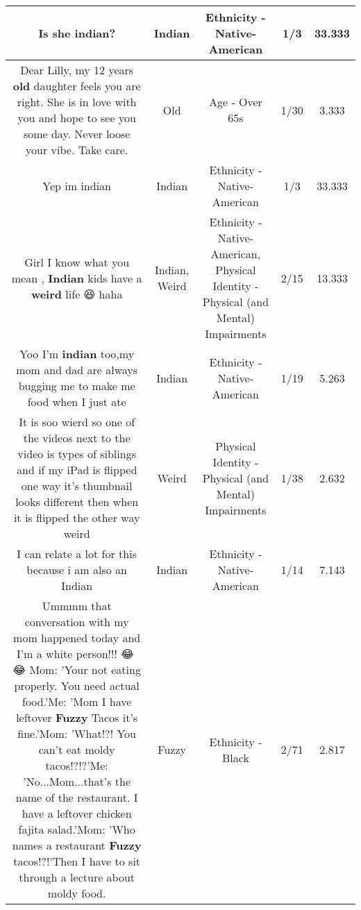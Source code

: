 \documentclass[11pt]{article}
\newlength\mylength
\begin{document}
\begin{center}
\begin{longtable}{|C{.65\mylength}|C{.30\mylength}|C{.12\mylength}|C{.12\mylength}|C{.12\mylength}|}
  \small Is she \textbf{indian}?\normalsize   & Indian & Ethnicity - Native-American & 1/3 & 33.333 \\  \hline
  \small Dear Lilly, my 12 years \textbf{old} daughter feels you are right. She is in love with you and hope to see you some day. Never loose your vibe. Take care.\normalsize   & Old & Age - Over 65s & 1/30 & 3.333 \\  \hline
  \small Yep im indian\normalsize   & Indian & Ethnicity - Native-American & 1/3 & 33.333 \\  \hline
  \small Girl I know what you mean , \textbf{Indian} kids have a \textbf{weird} life 😆 haha\normalsize   & Indian, Weird & Ethnicity - Native-American, Physical Identity - Physical (and Mental) Impairments & 2/15 & 13.333 \\  \hline
  \small Yoo I'm \textbf{indian} too,my mom and dad are always bugging me to make me food when I just ate\normalsize   & Indian & Ethnicity - Native-American & 1/19 & 5.263 \\  \hline
  \small It is soo wierd so one of the videos next to the video is types of siblings and if my iPad is flipped one way it's thumbnail looks different then when it is flipped the other way weird\normalsize   & Weird & Physical Identity - Physical (and Mental) Impairments & 1/38 & 2.632 \\  \hline
  \small I can relate a lot for this because i am also an Indian\normalsize   & Indian & Ethnicity - Native-American & 1/14 & 7.143 \\  \hline
  \small Ummmm that conversation with my mom happened  today and I'm a white person!!! 😂🤣😂 Mom: 'Your not eating properly. You need actual food.'Me: 'Mom I have leftover \textbf{Fuzzy} Tacos it's fine.'Mom: 'What!?! You can't eat moldy tacos!?!?'Me: 'No...Mom...that's the name of the restaurant. I have a leftover chicken fajita salad.'Mom: 'Who names a restaurant \textbf{Fuzzy} tacos!?!'Then I have to sit through a lecture about moldy food.\normalsize   & Fuzzy & Ethnicity - Black & 2/71 & 2.817 \\  \hline

\end{longtable}
\end{center}
\end{document}
